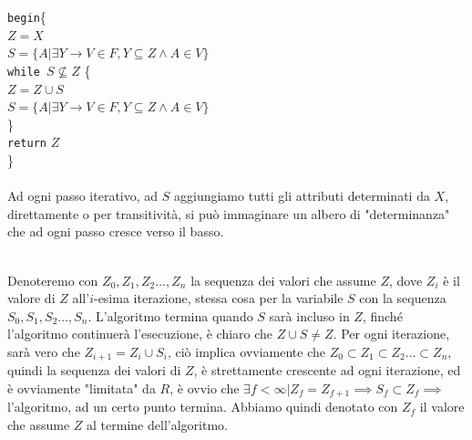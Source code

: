 \documentclass[12pt, letterpaper]{article}
\newcommand{\codee}[1]{\colorbox{white}{\texttt{#1}}}
\newcommand{\acc}{\\\hphantom{}\\}
\begin{document}
\hphantom{ident}\codee{begin}\{\\
\hphantom{ident}\hphantom{ident}\(Z=X\)\\
\hphantom{ident}\hphantom{ident}\(S=\{A|\exists Y\rightarrow V\in F,Y\subseteq Z\land A\in V\}\)\\
\hphantom{ident}\hphantom{ident}\codee{while }\(S \nsubseteq  Z\) \{\\
\hphantom{ident}\hphantom{ident}\hphantom{ident}\(Z=Z\cup S\)\\
\hphantom{ident}\hphantom{ident}\hphantom{ident}\(S=\{A|\exists Y\rightarrow V\in F,Y\subseteq Z\land A\in V\}\)\\
\hphantom{ident}\hphantom{ident}\}\\
\hphantom{ident}\codee{return} \(Z\)\\\hphantom{ident}\}\\\hphantom{}\\
Ad ogni passo iterativo, ad \(S\) aggiungiamo tutti gli attributi determinati da \(X\), direttamente 
o per transitività, si può immaginare un albero di "determinanza" che ad ogni passo cresce verso il basso.
\begin{figure}[h]
\end{figure}\\
Denoteremo con \(Z_0,Z_1,Z_2\dots,Z_n\) la sequenza dei valori che assume \(Z\), dove \(Z_i\) è il valore 
di \(Z\) all'\(i\)-esima iterazione, stessa cosa per la variabile \(S\) con la sequenza \(S_0,S_1,S_2\dots,S_n\). L'algoritmo 
termina quando \(S\) sarà incluso in \(Z\), finché l'algoritmo continuerà l'esecuzione, è chiaro che 
\(Z\cup S\ne Z\). Per ogni iterazione, sarà vero che \(Z_{i+1}=Z_i\cup S_i\), ciò implica ovviamente che 
\(Z_0\subset Z_1\subset Z_2\dots\subset Z_n\), quindi la sequenza dei valori di \(Z\), è strettamente crescente ad ogni iterazione, 
ed è ovviamente "limitata" da \(R\), è ovvio che \(\exists f<\infty|Z_f=Z_{f+1}\implies S_f\subset Z_f\implies \) l'algoritmo, 
ad un certo punto termina. Abbiamo quindi denotato con \(Z_f\) il valore che assume \(Z\) al termine dell'algoritmo.\acc 
\end{document}
